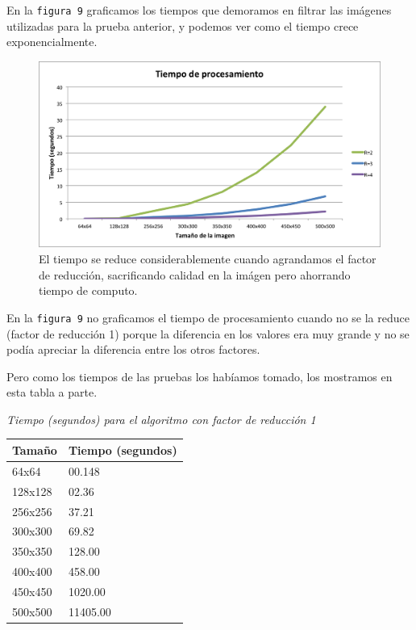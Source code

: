 \documentclass[a4paper]{article}
\begin{document}
En la \texttt{figura 9} graficamos los tiempos que demoramos en filtrar las imágenes utilizadas para la prueba anterior, y podemos ver como el tiempo crece exponencialmente.

\begin{figure}[H]
  \centering
  \includegraphics[scale=0.8]{graficos/Tiempo-factor_reduccion.png}
  \caption{ El tiempo se reduce considerablemente cuando agrandamos el factor de reducción, sacrificando calidad en la imágen pero ahorrando tiempo de computo. }
\end{figure}

En la \texttt{figura 9} no graficamos el tiempo de procesamiento cuando no se la reduce (factor de reducción 1) porque la diferencia en los valores era muy grande y no se podía apreciar la diferencia entre los otros factores.

Pero como los tiempos de las pruebas los habíamos tomado, los mostramos en esta tabla a parte.

\vspace{2em}
\textit{Tiempo (segundos) para el algoritmo con factor de reducción 1}
\begin{center}
\begin{tabular}{|l|l|}
  \hline
  Tamaño & Tiempo (segundos) \\
  \hline
64x64 & 00.148 \\
128x128 & 02.36  \\
256x256 & 37.21 \\
300x300 & 69.82 \\
350x350 & 128.00 \\ 
400x400 & 458.00 \\
450x450 & 1020.00 \\
500x500 & 11405.00 \\
\hline
\end{tabular}
\end{center} 
\vspace{1em}
\end{document}
